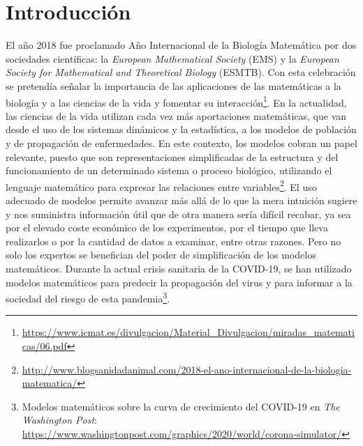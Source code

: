 \chapter{Introducción}
\label{cap:introduccion}


El año 2018 fue proclamado Año Internacional de la Biología Matemática por dos sociedades científicas: la \textit{European Mathematical Society} (EMS) y la \textit{European Society for Mathematical and Theoretical Biology} (ESMTB). Con esta celebración se pretendía señalar la importancia de las aplicaciones de las matemáticas a la biología y a las ciencias de la vida y fomentar su interacción\footnote{\url{https://www.icmat.es/divulgacion/Material_Divulgacion/miradas_matematicas/06.pdf}}. En la actualidad, las ciencias de la vida utilizan cada vez más aportaciones matemáticas, que van desde el uso de los sistemas dinámicos y la estadística, a los modelos de población y de propagación de enfermedades. En este contexto, los modelos cobran un papel relevante, puesto que son representaciones simplificadas de la estructura y del funcionamiento de un determinado sistema o proceso biológico, utilizando el lenguaje matemático para expresar las relaciones entre variables\footnote{\url{http://www.blogsanidadanimal.com/2018-el-ano-internacional-de-la-biologia-matematica/}}. El uso adecuado de modelos permite avanzar más allá de lo que la mera intuición sugiere y nos suministra información útil que de otra manera sería difícil recabar, ya sea por el elevado coste económico de los experimentos, por el tiempo que lleva realizarlos o por la cantidad de datos a examinar, entre otras razones. Pero no solo los expertos se benefician del poder de simplificación de los modelos matemáticos. Durante la actual crisis sanitaria de la COVID-19, se han utilizado modelos matemáticos para predecir la propagación del virus y para informar a la sociedad del riesgo de esta pandemia\footnote{Modelos matemáticos sobre la curva de crecimiento del COVID-19 en \textit{The Washington Post}: \url{https://www.washingtonpost.com/graphics/2020/world/corona-simulator/}}. 


